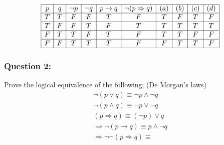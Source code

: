 \documentclass[12pt,a4paper]{article}
\begin{document}
\begin{align*}
    \begin{array}{|c|c|c|c|c|c|c|c|c|c|}
    \hline p & q & \neg p & \neg q & p \rightarrow q & \neg(p \Rightarrow q) & (a) & (b) & (c) & (d) \\
    \hline T & T & F & F & T & F & T & F & T & F \\
    \hline T & F & F & T & F & T & T & T & T & T \\
    \hline F & T & T & F & T & F & T & T & F & F \\
    \hline F & F & T & T & T & F & F & T & T & F \\
    \hline
    \end{array}
    \end{align*}

\subsubsection*{Question 2:} Prove the logical equivalence of the following; (De Morgan's laws)
 \begin{align*}
    \neg(p \vee q) \equiv \neg p \wedge \neg q\\
    \neg(p \wedge q) \equiv \neg p \vee \neg q\\
    ( p \Rightarrow q) \equiv (\neg p ) \vee q\\
    \Rightarrow \neg (p \rightarrow q) \equiv p \wedge \neg q\\
    \Rightarrow \neg \neg( p \Rightarrow q) \equiv 
\end{align*}
\end{document}
